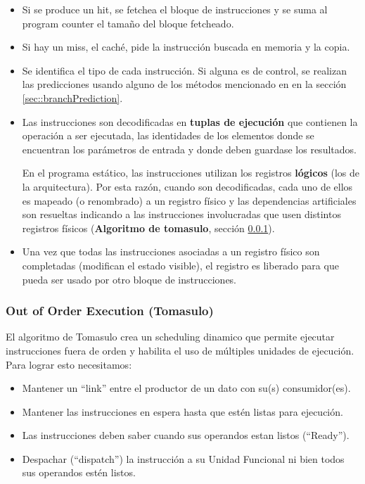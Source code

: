 \begin{itemize}
	\item Si se produce un hit, se fetchea el bloque de instrucciones y se suma al program counter el tamaño del bloque fetcheado.
	\item Si hay un miss, el caché, pide la instrucción buscada en memoria y la copia.
	\item Se identifica el tipo de cada instrucción. Si alguna es de control, se realizan las predicciones usando alguno de los métodos mencionado en en la sección \ref{sec::branchPrediction}.
	\item Las instrucciones son decodificadas en  \textbf{tuplas de ejecución} que contienen la operación a ser ejecutada, las identidades de los elementos donde se encuentran los parámetros de entrada y donde deben guardase los resultados. 
	
	En el programa estático, las instrucciones utilizan los registros \textbf{lógicos} (los de la arquitectura). Por esta razón, cuando son decodificadas, cada uno de ellos es mapeado (o renombrado) a un registro físico y las dependencias artificiales son resueltas indicando a las instrucciones involucradas que usen distintos registros físicos (\textbf{Algoritmo de tomasulo}, sección \ref{ilp::tomasulo}).

	\item Una vez que todas las instrucciones asociadas a un registro físico son completadas (modifican el estado visible), el registro es liberado para que pueda ser usado por otro bloque de instrucciones. 		
\end{itemize}


\subsubsection{Out of Order Execution (Tomasulo)}\label{ilp::tomasulo}
El algoritmo de Tomasulo crea un scheduling dinamico que permite ejecutar instrucciones fuera de orden y habilita el uso de múltiples unidades de ejecución. Para lograr esto necesitamos:
\begin{itemize}
	\item Mantener un ``link'' entre el productor de un dato con su(s) consumidor(es).
	\item Mantener las instrucciones en espera hasta que estén listas para ejecución.
	\item Las instrucciones deben saber cuando sus operandos estan listos (``Ready'').
	\item Despachar (``dispatch'') la instrucción a su Unidad Funcional ni bien todos sus operandos estén listos.
\end{itemize}

